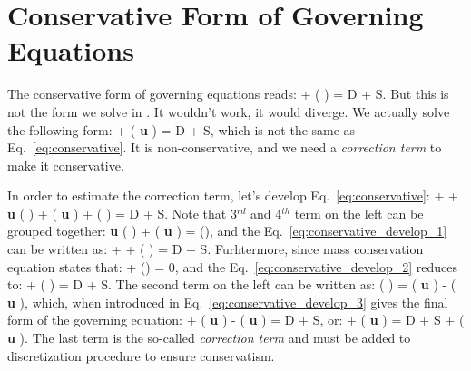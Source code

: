 \documentclass[fleqn]{article}    %
\begin{document}

\section{Conservative Form of Governing Equations}

\noindent
The conservative form of governing equations reads:
%
\be
  + \nabla (  \phi ) 
  = D + S.
  \label{eq:conservative}
\ee
%
But this is not the form we solve in {\psiboil}. 
It wouldn't work, it would diverge.
We actually solve the following form:
%
\be 
    \rho {} 
  + \rho \nabla ( {\bf u} \phi ) 
  = D + S,
  \label{eq:nonconservative}
\ee
%
which is not the same as Eq.~\ref{eq:conservative}. It is non-conservative, 
and we need a {\em correction term} to make it conservative. 

\noindent
In order to estimate the correction term, let's develop 
Eq.~\ref{eq:conservative}:
%
\be 
    \rho {} 
  + \phi {} 
  + {\bf u} \phi \nabla ( \rho ) 
  + \rho \phi \nabla ( {\bf u} ) 
  +  \nabla ( \phi ) 
  = D + S.
  \label{eq:conservative_develop_1}
\ee
%
Note that 3$^{rd}$ and 4$^{th}$ term on the left can be grouped together:
%
\be 
    {\bf u} \phi \nabla ( \rho ) 
  + \rho \phi \nabla ( {\bf u} ) 
  = \phi \nabla(),
  \label{eq:note_1}
\ee
%
and the Eq.~\ref{eq:conservative_develop_1} can be written as:
%
\be 
    \rho {} 
  + \phi {}
  +  \nabla ( \phi ) 
  = D + S.
  \label{eq:conservative_develop_2}
\ee
%
Furhtermore, since mass conservation equation states that:
%
\be 
  + \nabla()
  = 0,
  \label{eq:note_2}
\ee
%
and the Eq.~\ref{eq:conservative_develop_2} reduces to:
%
\be 
    \rho {} 
  +  \nabla ( \phi ) 
  = D + S.
  \label{eq:conservative_develop_3}
\ee
%
The second term on the left can be written as:
%
\be 
     \nabla ( \phi ) 
  = \rho \nabla ( {\bf u} \phi )
  - \rho \phi \nabla ( {\bf u} ),
  \label{eq:note_3}
\ee
%
which, when introduced in Eq.~\ref{eq:conservative_develop_3} gives the final
form of the governing equation:
%
\be 
    \rho {} 
  + \rho \nabla ( {\bf u} \phi )
  - \rho \phi \nabla ( {\bf u} )
  = D + S,
  \label{eq:conservative_develop_4}
\ee
%
or:
%
\be 
    \rho {} 
  + \rho \nabla ( {\bf u} \phi )
  = D + S
  + \rho \phi \nabla ( {\bf u} ).
  \label{eq:conservative_final}
\ee
%
The last term is the so-called {\em correction term} and must be added to 
discretization procedure to ensure conservatism.
\end{document}
